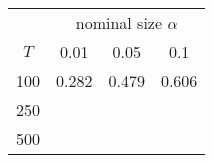 % 
\begin{tabular}{cccc}
  \hline
  & \multicolumn{3}{c}{nominal size $\alpha$} \\
 $T$ & 0.01 & 0.05 & 0.1 \\
 \hline
100 & 0.282 & 0.479 & 0.606 \\ 
  250 &  &  &  \\ 
  500 &  &  &  \\ 
   \hline
\end{tabular}
